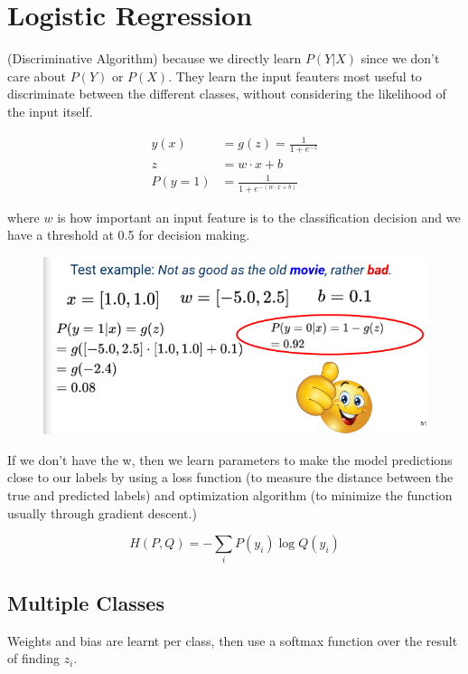 \documentclass[11pt]{article}
\begin{document}
\section{Logistic Regression}

(Discriminative Algorithm) because we directly learn $P(Y|X)$ since we don't care about $P(Y)$ or $P(X)$. They learn the input feauters most useful to discriminate between the different classes, without considering the likelihood of the input itself.

\begin{align*}
    y(x) & = g(z) = \frac 1 {1 + e^{-z}} \\
    z & = w \cdot x + b \\
    P(y=1) & = \frac{1 } {1 + e^{- (w \cdot x + b)}}
\end{align*}

where $w$ is how important an input feature is to the classification decision and we have a threshold at 0.5 for decision making.

\begin{figure}[H]
    \centering
    \includegraphics*[width=.6\linewidth]{figures/example2.png}
\end{figure}

If we don't have the w, then we learn parameters to make the model predictions close to our labels by using a loss function (to measure the distance between the true and predicted labels) and optimization algorithm (to minimize the function usually through gradient descent.)

\begin{definition}
    \begin{equation*}
        H(P,Q) = -\sum_i P(y_i)\log Q(y_i)
    \end{equation*}
\end{definition}

\subsection{Multiple Classes}

Weights and bias are learnt per class, then use a softmax function over the result of finding $z_i$.
\end{document}
